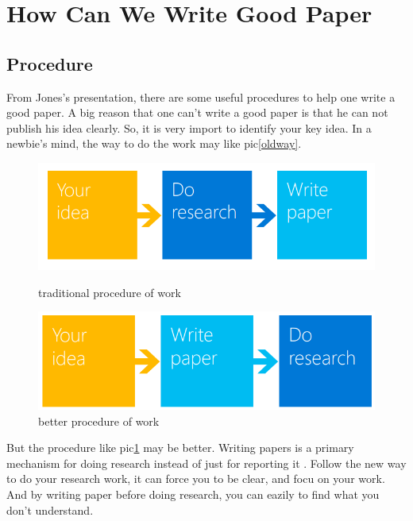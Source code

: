 \documentclass{article}
\begin{document}
\section{How Can We Write Good Paper}
\subsection{Procedure}
From Jones's\cite{AGreatResearchPaper} presentation, 
there are some useful procedures to help one write a good paper.
A big reason that one can't write a good paper is that he can not publish his idea clearly.
So, it is very import to identify your key idea.
In a newbie's mind, the way to do the work may like pic\ref{oldway}.

\begin{figure}[]
    \centering
    \includegraphics[width=1\textwidth]{1.png}    
    \caption{traditional procedure of work}
    \label{oldway}
    \includegraphics[width=1\textwidth]{2.png}    
    \caption{better procedure of work}
    \label{newway}
\end{figure}

But the procedure like pic\ref{newway} may be better.
Writing papers is a primary mechanism for doing research instead of just for reporting it \cite{AGreatResearchPaper}.
Follow the new way to do your research work, it can force you to be clear, 
and focu on your work.
And by writing paper before doing research, you can eazily to find what you don't understand.
\end{document}
